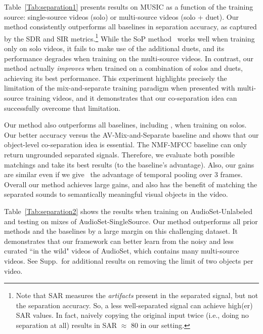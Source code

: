 \documentclass[10pt,twocolumn,letterpaper]{article}
\begin{document}
Table~\ref{Tab:separation1} presents results on MUSIC as a function of the training source: single-source videos (solo) or multi-source videos (solo + duet). Our method consistently outperforms all baselines in separation accuracy, as captured by the SDR and SIR metrics.\footnote{Note that SAR measures the \emph{artifacts} present in the separated signal, but not the separation accuracy. So, a less well-separated signal can achieve high(er) SAR values. In fact, naively copying the original input twice (i.e., doing no separation at all) results in SAR $\approx$ 80 in our setting.} While the SoP method~\cite{zhao2018sound} works well when training only on solo videos, it fails to make use of the additional duets, and its performance degrades when training on the multi-source videos. In contrast, our method actually \emph{improves} when trained on a combination of solos and duets, achieving its best performance. This experiment highlights precisely the limitation of the mix-and-separate training paradigm when presented with multi-source training videos, and it demonstrates that our co-separation idea can successfully overcome that limitation.

Our method also outperforms all baselines, including \cite{zhao2018sound}, when training on solos. Our better accuracy versus the AV-Mix-and-Separate baseline and \cite{zhao2018sound} shows that our object-level co-separation idea is essential. The NMF-MFCC baseline can only return ungrounded separated signals. Therefore, we evaluate both possible matchings and take its best results (to the baseline's advantage). Also, our gains are similar even if we give~\cite{zhao2018sound} the advantage of temporal pooling over 3 frames. Overall our method achieves large gains, and also has the benefit of matching the separated sounds to semantically meaningful visual objects in the video.


Table~\ref{Tab:separation2} shows the results when training on AudioSet-Unlabeled and testing on mixes of AudioSet-SingleSource. Our method outperforms all prior methods and the baselines by a large margin on this challenging dataset. It demonstrates that our framework can better learn from the noisy and less curated ``in the wild" videos of AudioSet, which contains many multi-source videos. See Supp.~for additional results on removing the limit of two objects per video.
\end{document}
